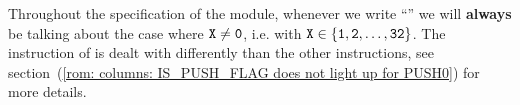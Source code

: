 \label{rom: intro: convention: PUSHX implicitly refers to PUSH1 through PUSH32 but not PUSH0}
Throughout the specification of the \romMod{} module, whenever we write
``'' we will \textbf{always} be talking about the case where $\texttt{X} \neq \texttt{0}$, i.e. with $\texttt{X} \in \{ \texttt{1}, \texttt{2}, \dots, \texttt{32} \}$.
The  instruction of \cite{EIP-3855} is dealt with differently than the other  instructions,
see section~(\ref{rom: columns: IS_PUSH_FLAG does not light up for PUSH0}) for more details.
